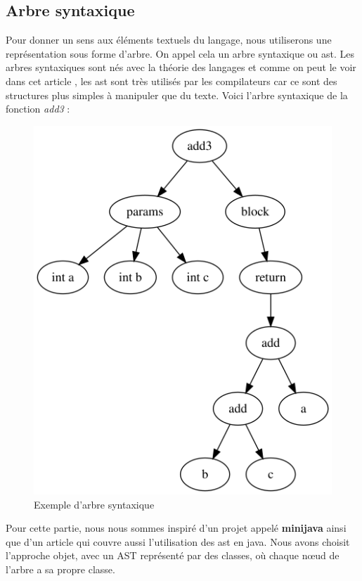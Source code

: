 \documentclass[a4paper]{article}%
\begin{document}


\clearpage{}

\subsection{Arbre syntaxique}

Pour donner un sens aux éléments textuels du langage, nous utiliserons une
représentation sous forme d'arbre. On appel cela un arbre syntaxique ou
\gls{ast}. Les arbres syntaxiques sont nés avec la
théorie des langages et comme on peut le voir dans cet article
\cite{compilerTICH}, les \gls{ast} sont très utilisés par les compilateurs car ce sont
des structures plus simples à manipuler que du texte. Voici l'arbre syntaxique
de la fonction \textit{add3} :

\begin{figure}[h]
  \begin{center}
  \includegraphics[scale=0.4]{img/ast1.png}
  \caption{Exemple d'arbre syntaxique}
  \end{center}
\end{figure}

Pour cette partie, nous nous sommes inspiré d'un projet appelé \textbf{minijava}
\cite{minijava} ainsi que d'un article \cite{gagnon1998sablecc} qui couvre aussi
l'utilisation des \gls{ast} en java. Nous avons choisit l'approche objet, avec un AST
représenté par des classes, où chaque nœud de l'arbre a sa propre classe.\\
\end{document}
